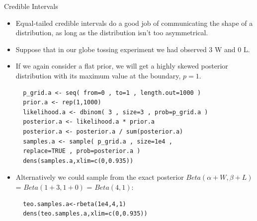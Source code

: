 \documentclass[handout]{beamer}
\begin{document}
\begin{frame}[fragile]{Credible Intervals}
\scriptsize{
\begin{itemize}

\item Equal-tailed credible intervals do a good job of communicating the shape of a distribution, as long as the distribution isn't too asymmetrical.

\item Suppose that in our globe tossing experiment we had observed 3 W and 0 L.

\item If we again consider a flat prior, we will get a highly skewed posterior distribution with its maximum value at the boundary, $p = 1$.

\begin{verbatim}
  p_grid.a <- seq( from=0 , to=1 , length.out=1000 )
  prior.a <- rep(1,1000)
  likelihood.a <- dbinom( 3 , size=3 , prob=p_grid.a )
  posterior.a <- likelihood.a * prior.a
  posterior.a <- posterior.a / sum(posterior.a)
  samples.a <- sample( p_grid.a , size=1e4 , 
  replace=TRUE , prob=posterior.a )
  dens(samples.a,xlim=c(0,0.935))
\end{verbatim}

\item Alternatively we could sample from the exact posterior $Beta(\alpha + W , \beta + L)$ = $Beta(1 + 3 , 1 + 0)$ = $Beta(4,1)$:

\begin{verbatim}
  teo.samples.a<-rbeta(1e4,4,1)
  dens(teo.samples.a,xlim=c(0,0.935))
\end{verbatim}


\end{itemize}



} 

\end{frame}
\end{document}
